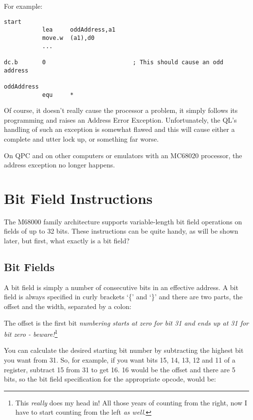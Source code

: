 For example:

\begin{lstlisting}[firstnumber=1,caption={How to Blow Up an MC68008}]
start
           lea     oddAddress,a1
           move.w  (a1),d0
           ...
           
dc.b       0                         ; This should cause an odd address 

oddAddress
           equ     *           
\end{lstlisting}

Of course, it doesn't really cause the processor a problem, it simply follows its programming and raises an Address Error Exception. Unfortunately, the QL's handling of such an exception is somewhat flawed and this will cause either a complete and utter lock up, or something far worse.

On QPC  and on other computers or emulators with an MC68020 processor, the address exception no longer happens.

\section{Bit Field Instructions}

The M68000 family architecture supports variable-length bit field operations on fields of up to 32 bits. These instructions can be quite handy, as will be shown later, but first, what exactly is a bit field?

\subsection{Bit Fields}\label{chp-mc68020-bitfields}

A bit field is simply a number of consecutive bits in an effective address. A bit field is always specified in curly brackets `\{' and `\}' and there are two parts, the offset and the width, separated by a colon:


The offset is the first bit \emph{numbering starts at zero for bit 31 and ends up at 31 for bit zero - beware!}\footnote{This \emph{really} does my head in! All those years of counting from the right, now I have to start counting from the left \emph{as well}.} 
	
You can calculate the desired starting bit number by subtracting the highest bit you want from 31. So, for example, if you want bits 15, 14, 13, 12 and 11 of a register, subtract 15 from 31 to get 16. 16 would be the offset and there are 5 bits, so the bit field specification for the appropriate opcode, would be:

